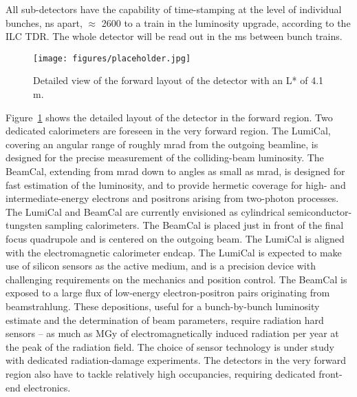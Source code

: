 All sub-detectors have the capability of time-stamping at the level of individual bunches, \unit[366]{ns} apart, $\approx$ 2600 to a train in the luminosity upgrade, according to the ILC TDR. The whole detector will be read out in the \unit[200]{ms} between bunch trains.

\begin{figure}
\centering
\texttt{[image: figures/placeholder.jpg]}
\caption{Detailed view of the forward layout of the detector with an L* of 4.1 m.}
\label{fig:forward_region_new_Lstar}
\end{figure}
Figure~\ref{fig:forward_region_new_Lstar} shows the detailed layout of the detector in the forward region.
Two dedicated calorimeters are foreseen in the very forward region. The LumiCal, covering an angular range of roughly \unit[40-90]{mrad} from the outgoing beamline, is designed for the precise measurement of the colliding-beam luminosity.  The BeamCal, extending from \unit[40]{mrad} down to angles as small as \unit[5]{mrad}, is designed for fast estimation of the luminosity, and to provide hermetic coverage for high- and intermediate-energy electrons and positrons arising from two-photon processes. The LumiCal and BeamCal are currently envisioned as cylindrical semiconductor-tungsten sampling calorimeters. The BeamCal is placed just in front of the final focus quadrupole and is centered on the outgoing beam. The LumiCal is aligned with the electromagnetic calorimeter endcap. The LumiCal is expected to make use of silicon sensors as the active medium, and is a precision device with challenging requirements on the mechanics and position control. The BeamCal is exposed to a large flux of low-energy electron-positron pairs originating from beamstrahlung. These depositions, useful for a bunch-by-bunch luminosity estimate and the determination of beam parameters, require radiation hard sensors -- as much as \unit[1]{MGy} of electromagnetically induced radiation per year at the peak of the radiation field. The choice of sensor technology is under study with dedicated radiation-damage experiments. The detectors in the very forward region also have to tackle relatively high occupancies, requiring dedicated front-end electronics.

